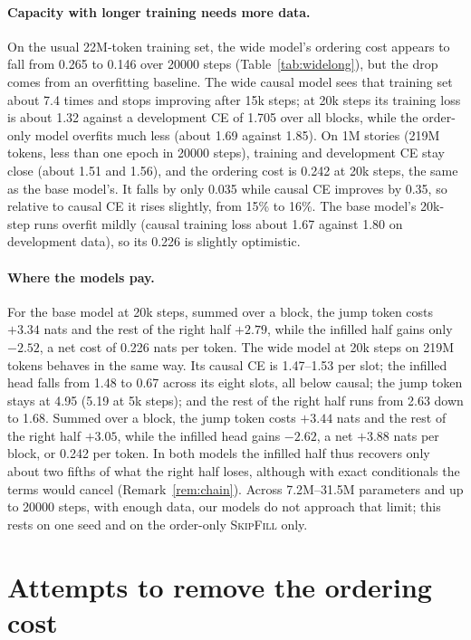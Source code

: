 \documentclass{article}
\theoremstyle{definition}
\theoremstyle{remark}
\newcommand{\name}[1]{\textup{\textsc{#1}}}
\newcommand{\sfill}{\name{SkipFill}\xspace}
\begin{document}
\paragraph{Capacity with longer training needs more data.}
On the usual 22M-token training set, the wide model's ordering cost appears to fall from 0.265 to 0.146 over 20000 steps (Table~\ref{tab:widelong}), but the drop comes from an overfitting baseline.
The wide causal model sees that training set about 7.4 times and stops improving after 15k steps; at 20k steps its training loss is about 1.32 against a development CE of 1.705 over all blocks, while the order-only model overfits much less (about 1.69 against 1.85).
On 1M stories (219M tokens, less than one epoch in 20000 steps), training and development CE stay close (about 1.51 and 1.56), and the ordering cost is 0.242 at 20k steps, the same as the base model's.
It falls by only 0.035 while causal CE improves by 0.35, so relative to causal CE it rises slightly, from 15\% to 16\%.
The base model's 20k-step runs overfit mildly (causal training loss about 1.67 against 1.80 on development data), so its 0.226 is slightly optimistic.

\paragraph{Where the models pay.}
For the base model at 20k steps, summed over a block, the jump token costs $+3.34$ nats and the rest of the right half $+2.79$, while the infilled half gains only $-2.52$, a net cost of 0.226 nats per token.
The wide model at 20k steps on 219M tokens behaves in the same way.
Its causal CE is 1.47--1.53 per slot; the infilled head falls from 1.48 to 0.67 across its eight slots, all below causal; the jump token stays at 4.95 (5.19 at 5k steps); and the rest of the right half runs from 2.63 down to 1.68.
Summed over a block, the jump token costs $+3.44$ nats and the rest of the right half $+3.05$, while the infilled head gains $-2.62$, a net $+3.88$ nats per block, or 0.242 per token.
In both models the infilled half thus recovers only about two fifths of what the right half loses, although with exact conditionals the terms would cancel (Remark~\ref{rem:chain}).
Across 7.2M--31.5M parameters and up to 20000 steps, with enough data, our models do not approach that limit; this rests on one seed and on the order-only \sfill only.

\section{Attempts to remove the ordering cost}
\label{app:remedies}
\end{document}
